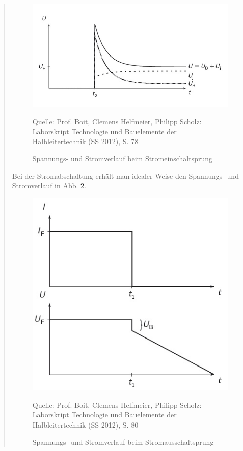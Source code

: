 \begin{quote}
    \begin{figure}[H]
        \centering
        \includegraphics[scale=0.8]{./SchaltverhaltenBilder/Stromeinschalten.jpg}
        \caption{Spannungs- und Stromverlauf beim Stromeinschaltsprung}
             \begin{center}
                 \small Quelle: Prof. Boit, Clemens Helfmeier, Philipp Scholz: Laborskript Technologie und Bauelemente der Halbleitertechnik (SS 2012), S. 78
             \end{center}
        \label{fig:Stromeinschalten}
    \end{figure}

    \vspace{2em}

    Bei der Stromabschaltung erhält man idealer Weise den Spannungs- und
    Stromverlauf in Abb. \ref{fig:Stromausschalten}.

    \vspace{2em}

    \begin{figure}[H]
        \centering
        \includegraphics[scale=0.8]{./SchaltverhaltenBilder/Stromausschalten.jpg}
        \caption{Spannungs- und Stromverlauf beim Stromausschaltsprung}
             \begin{center}
                 \small Quelle: Prof. Boit, Clemens Helfmeier, Philipp Scholz: Laborskript Technologie und Bauelemente der Halbleitertechnik (SS 2012), S. 80
             \end{center}
        \label{fig:Stromausschalten}
    \end{figure}


\end{quote}
